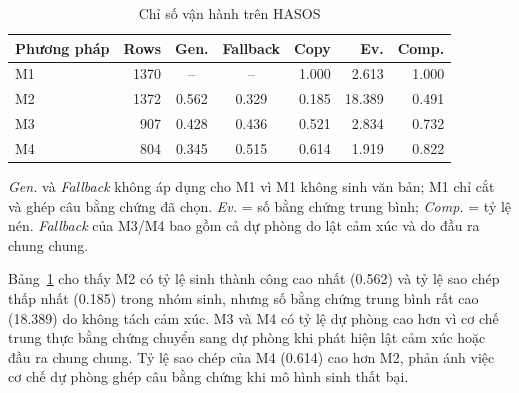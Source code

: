\documentclass[12pt,a4paper]{report}
\begin{document}
\begin{table}[tbp]
\centering
\caption{Chỉ số vận hành trên HASOS}
\label{tab:production-ops}
\begin{threeparttable}
\begin{tabular}{l r c c r r r}
\toprule
\textbf{Phương pháp} & \textbf{Rows} & \textbf{Gen.} & \textbf{Fallback} & \textbf{Copy} & \textbf{Ev.} & \textbf{Comp.} \\
\midrule
M1 & 1370 & -- & -- & \num{1.000} & \num{2.613} & \num{1.000} \\
M2 & 1372 & \num{0.562} & \num{0.329} & \num{0.185} & \num{18.389} & \num{0.491} \\
M3 &  907 & \num{0.428} & \num{0.436} & \num{0.521} & \num{2.834} & \num{0.732} \\
M4 &  804 & \num{0.345} & \num{0.515} & \num{0.614} & \num{1.919} & \num{0.822} \\
\bottomrule
\end{tabular}
\begin{tablenotes}
\footnotesize
\item \textit{Gen.} và \textit{Fallback} không áp dụng cho M1 vì M1 không sinh văn bản; M1 chỉ cắt và ghép câu bằng chứng đã chọn. \textit{Ev.} = số bằng chứng trung bình; \textit{Comp.} = tỷ lệ nén. \textit{Fallback} của M3/M4 bao gồm cả dự phòng do lật cảm xúc và do đầu ra chung chung.
\end{tablenotes}
\end{threeparttable}
\end{table}

Bảng~\ref{tab:production-ops} cho thấy M2 có tỷ lệ sinh thành công cao nhất (\num{0.562}) và tỷ lệ sao chép thấp nhất (\num{0.185}) trong nhóm sinh, nhưng số bằng chứng trung bình rất cao (\num{18.389}) do không tách cảm xúc. M3 và M4 có tỷ lệ dự phòng cao hơn vì cơ chế trung thực bằng chứng chuyển sang dự phòng khi phát hiện lật cảm xúc hoặc đầu ra chung chung. Tỷ lệ sao chép của M4 (\num{0.614}) cao hơn M2, phản ánh việc cơ chế dự phòng ghép câu bằng chứng khi mô hình sinh thất bại.
\end{document}
